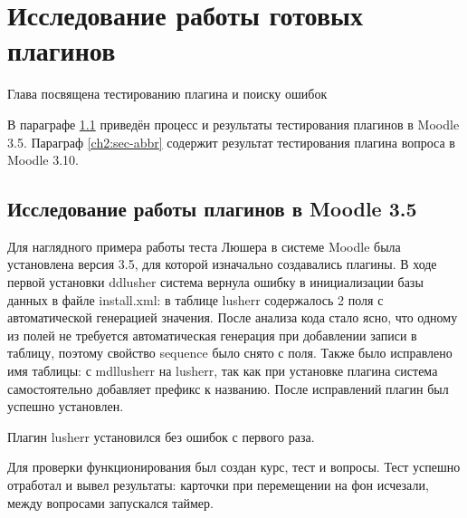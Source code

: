 \chapter{Исследование работы готовых плагинов} \label{ch2}
	

Глава посвящена тестированию плагина и поиску ошибок

В параграфе \ref{ch2:title-abbr} приведён процесс и результаты тестирования плагинов в Moodle 3.5. Параграф \ref{ch2:sec-abbr} содержит результат тестирования плагина вопроса в Moodle 3.10. 


\section{Исследование работы плагинов в Moodle 3.5} \label{ch2:title-abbr} %

Для наглядного примера работы теста Люшера в системе Moodle была установлена версия 3.5, для которой изначально создавались плагины. 
В ходе первой установки ddlusher\cite{psy-test-ddlusher} система вернула ошибку в инициализации базы данных в файле install.xml: в таблице lusherr содержалось 2 поля с автоматической генерацией значения. После анализа кода стало ясно, что одному из полей не требуется автоматическая генерация при добавлении записи в таблицу, поэтому свойство sequence было снято с поля. Также было исправлено имя таблицы: с mdl\textunderscore lusherr на lusherr, так как при установке плагина система самостоятельно добавляет префикс к названию. После исправлений плагин был успешно установлен.

Плагин lusherr\cite{psy-test-lusherr} установился без ошибок с первого раза. 

Для проверки функционирования был создан курс, тест и вопросы. Тест успешно отработал и вывел результаты: карточки при перемещении на фон исчезали, между вопросами запускался таймер. 


